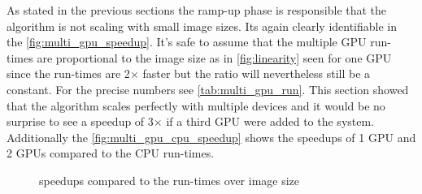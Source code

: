 As stated in the previous sections the ramp-up phase is responsible that the
algorithm is not scaling with small image sizes. Its again clearly identifiable
in the \autoref{fig:multi_gpu_speedup}. It's safe to assume that the multiple
\gls{GPU} run-times are proportional to the image size as in
\autoref{fig:linearity} seen for one \gls{GPU} since the run-times are 2$\times$
faster but the ratio will nevertheless still be a constant. For the precise
numbers see \autoref{tab:multi_gpu_run}. This section showed that the algorithm
scales perfectly with multiple devices and it would be no surprise to see a
speedup of 3$\times$ if a third \gls{GPU} were added to the system. Additionally
the \autoref{fig:multi_gpu_cpu_speedup} shows the speedups of 1 \gls{GPU} and 2
\glspl{GPU} compared to the \gls{CPU} run-times.

\begin{figure}[ht]
  \centering
	

	\tableA
	\tableB	

	\caption{{} speedups compared to the {} 
					 run-times over image size}%
	\label{fig:multi_gpu_cpu_speedup}
\end{figure}


